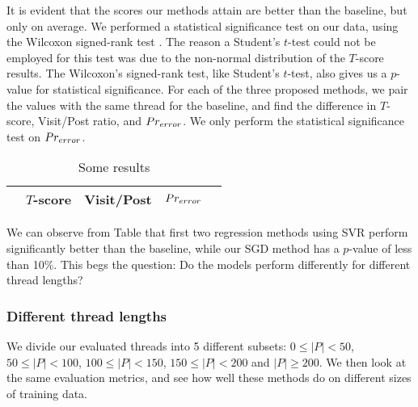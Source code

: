 It is evident that the scores our methods attain are better than the baseline, 
but only on average. We performed a statistical significance test on our data, 
using the Wilcoxon signed-rank test \cite{wilcoxon1945}. The reason a Student's 
$t$-test could not be employed for this test was due to the non-normal 
distribution of the $T$-score results. The Wilcoxon's signed-rank test, like 
Student's $t$-test, also gives us a $p$-value for statistical significance. For 
each of the three proposed methods, we pair the values with the same thread for 
the baseline, and find the difference in $T$-score, Visit/Post ratio, and 
$Pr_{error}$. We only perform the statistical significance test on $Pr_{error}$.

\begin{table}
	\footnotesize
\begin{center}
\begin{tabular}{| l | c | c | c | l |}
\hline
& $T$-score			   &	Visit/Post & 	$Pr_{error}$ &\\
\hline
	
\hline
\end{tabular}
\end{center}
\caption{Some results}\label{tbl:diff_eval}
\end{table}

We can observe from Table \label{tbl:diff} that first two regression methods 
using SVR perform significantly better than the baseline, while our SGD method 
has a $p$-value of less than 10\%. This begs the question: Do the models perform 
differently for different thread lengths?

\subsubsection{Different thread lengths}
We divide our evaluated threads into 5 different subsets: $0 \leq |P| < 50$,
$50 \leq |P| < 100$, $100 \leq |P| < 150$, $150 \leq |P| < 200$ and $|P| \geq 
200$. We then look at the same evaluation metrics, and see how well these 
methods do on different sizes of training data.

